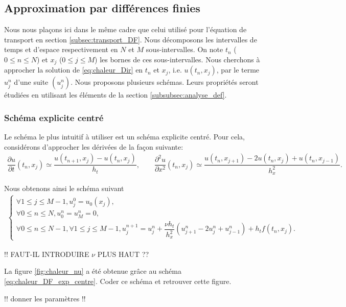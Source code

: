\documentclass[12pt,a4paper,twoside]{article}
\begin{document}
\subsection{Approximation par diff\'erences finies}


Nous nous pla\c{c}ons ici dans le m\^eme cadre que celui utilis\'e pour 
l'\'equation de transport en section \ref{subsec:transport_DF}.
Nous d\'ecomposons les intervalles de temps et d'espace
respectivement en $N$ et $M$ sous-intervalles.
On note $t_n$ ($0 \leq n \leq N$) et $x_j$ ($0 \leq j \leq M$)
les bornes de ces sous-intervalles.
Nous cherchons \`a approcher la solution de \eqref{eq:chaleur_Dir}
en $t_n$ et $x_j$, i.e. $u(t_n,x_j)$, par le terme $u_j^n$ d'une suite
$(u_j^n)$. 
Nous proposons plusieurs sch\'emas.
Leurs propri\'et\'es seront \'etudi\'ees en utilisant les 
\'el\'ements de la section \ref{subsubsec:analyse_def}.


\subsubsection{Sch\'ema explicite centr\'e}

Le sch\'ema le plus intuitif \`a utiliser est un sch\'ema 
explicite centr\'e.
Pour cela, consid\'erons d'approcher les d\'eriv\'ees de la fa\c{c}on suivante:
\begin{align*}
  \dfrac{\partial u}{\partial t}(t_n,x_j) \simeq \dfrac{u(t_{n+1},x_j) - u(t_n,x_j)}{h_t} ,
  \qquad 
  \dfrac{\partial^2 u}{\partial x^2}(t_n,x_j) 
  \simeq \dfrac{u(t_{n},x_{j+1}) - 2 u(t_n,x_j) + u(t_n,x_{j-1})}{h_x^2} .
\end{align*}


Nous obtenons ainsi le sch\'ema suivant
\begin{align}
  \label{eq:chaleur_DF_exp_centre}
  \left\{
  \begin{array}{l}
    \forall 1 \leq j \leq M-1 , 
    u_j^0 = u_0(x_j) ,
    \\
    \forall 0 \leq n \leq N, u_0^n = u_M^n = 0 ,
    \\
    \forall 0 \leq n \leq N-1, \forall 1 \leq j \leq M-1,
    u_j^{n+1} = u_j^{n} + \dfrac{\nu h_t}{h_x^2} (u_{j+1}^{n} - 2 u_{j}^{n} + u_{j-1}^{n} ) 
    + h_t f(t_n,x_j) .
  \end{array}
  \right.
\end{align}

!! FAUT-IL INTRODUIRE $\nu$ PLUS HAUT ??


\begin{exercise}
  La figure \ref{fig:chaleur_nu} 
  a \'et\'e obtenue gr\^ace au sch\'ema \eqref{eq:chaleur_DF_exp_centre}.
  Coder ce sch\'ema et retrouver cette figure.
  
  !! donner les param\`etres !!
\end{exercise}
\end{document}
